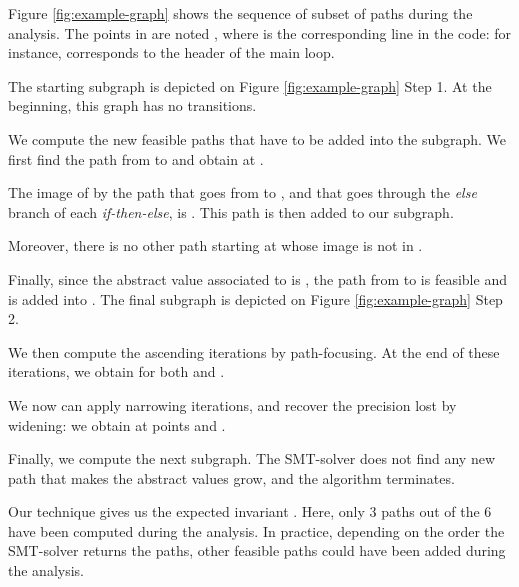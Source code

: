 Figure \ref{fig:example-graph} shows the sequence of subset of paths during the
analysis. The points in  are noted , where  is the corresponding
line in the code: for instance,  corresponds to the header of the main
loop.

\begin{compactenum}
	\item The starting subgraph is depicted on Figure
		\ref{fig:example-graph} Step 1. At the beginning, this graph has no
		transitions.
	\item
		We compute the new feasible paths that have to be added into the
		subgraph. We first find the path from  to  and obtain at 
		.
		
		The image of  by the path that goes from  to
		, and that goes through the \emph{else} branch of each 
		\emph{if-then-else}, is . This path
		is then added to our subgraph. 
		
		Moreover, there is no other path starting at  whose
		image is not in .

		Finally, since the abstract value associated to  is  
		, the path from
                 to  is
		feasible and is added into . The final subgraph is depicted on Figure
		\ref{fig:example-graph} Step 2.

	\item
		We then compute the ascending iterations by path-focusing. At the end of
		these iterations, we obtain 
 for both  and .
	\item
		We now can apply narrowing iterations, and recover the precision lost by
		widening: we obtain 
		 at points  and .
	\item Finally, we compute the next subgraph. The SMT-solver does not find any
		new path that makes the abstract values grow, and the algorithm
		terminates.

\end{compactenum}

Our technique gives us the expected invariant 
. 
Here, only 3 paths out of the 6 have been computed during the analysis. In
practice, depending on the order the SMT-solver returns the paths, other
feasible paths could have been added during the analysis.


